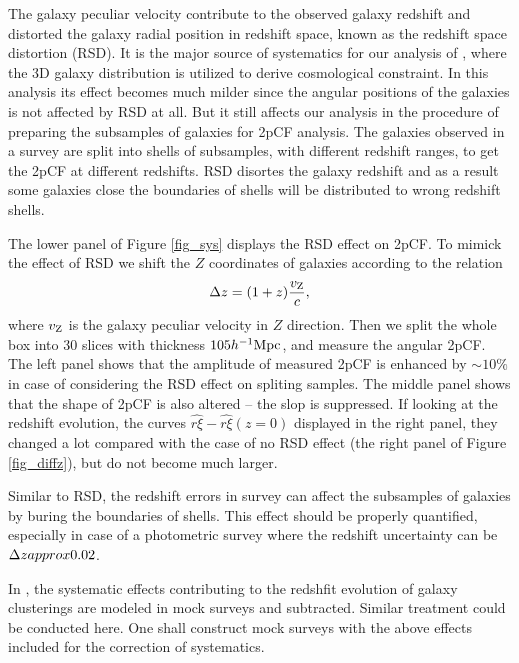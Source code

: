 \documentclass[iop]{emulateapj}
\begin{document}
The galaxy peculiar velocity contribute to the observed galaxy redshift and distorted the galaxy radial position in redshift space,
known as the redshift space distortion (RSD).
It is the major source of systematics for our analysis of \cite{Li2014,Li2015,Li2016}, where the 3D galaxy distribution is utilized to derive cosmological constraint.
In this analysis its effect becomes much milder since the angular positions of the galaxies is not affected by RSD at all.
But it still affects our analysis in the procedure of preparing the subsamples of galaxies for 2pCF analysis.
The galaxies observed in a survey are split into shells of subsamples, with different redshift ranges, to get the 2pCF at different redshifts.
RSD disortes the galaxy redshift and as a result some galaxies close the boundaries of shells will be distributed to wrong redshift shells.

The lower panel of Figure \ref{fig_sys} displays the RSD effect on 2pCF.
To mimick the effect of RSD we shift the $Z$ coordinates of galaxies according to the relation 
\begin{equation}\label{eq:zvpeu}
\Delta z = (1+z) \frac{v_{{\rm Z}}}{c},
\end{equation}
where $v_{{\rm Z}}$ is the galaxy peculiar velocity in $Z$ direction.
Then we split the whole box into 30 slices with thickness $105h^{-1}\rm Mpc$, 
and measure the angular 2pCF.
The left panel shows that the amplitude of measured 2pCF is enhanced by $\sim 10\%$ in case of considering the RSD effect on spliting samples.
The middle panel shows that the shape of 2pCF is also altered -- the slop is suppressed.
If looking at the redshift evolution,
the curves $\hat{r\xi} - \hat{r\xi}(z=0)$ displayed in the right panel,
they changed a lot compared with the case of no RSD effect (the right panel of Figure \ref{fig_diffz}),
but do not become much larger. %


Similar to RSD, the redshift errors in survey can affect the subsamples of galaxies by buring the boundaries of shells.
This effect should be properly quantified, especially in case of a photometric survey where the redshift uncertainty can be $\Delta z \\approx 0.02$.

In \cite{Li2014,Li2015,Li2016}, the systematic effects contributing to the redshfit evolution of galaxy clusterings 
are modeled in mock surveys and subtracted.
Similar treatment could be conducted here.
One shall construct mock surveys with the above effects included for the correction of systematics.
\end{document}
